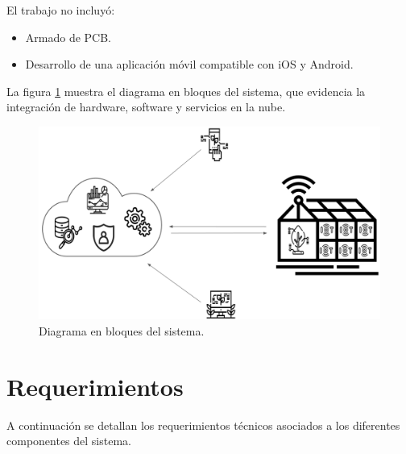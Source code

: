 El trabajo no incluyó:
\begin{itemize}
      \item Armado de PCB.
      \item Desarrollo de una aplicación móvil compatible con iOS y Android.
\end{itemize}

\hspace{1cm}

La figura \ref{fig:diagBloques} muestra el diagrama en bloques del sistema, que
evidencia la integración de hardware, software y servicios en la nube.

\begin{figure}[htpb]
      \centering
      \includegraphics[width=.99\textwidth]{./Figures/1.png}
      \caption{Diagrama en bloques del sistema.}
      \label{fig:diagBloques}
\end{figure}


\section{Requerimientos}

A continuación se detallan los requerimientos técnicos asociados a los
diferentes componentes del sistema.

